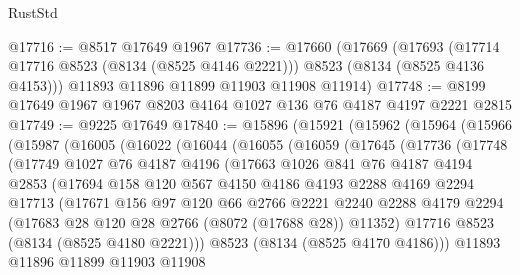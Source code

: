 \begin{lexlean}{RustStd}
\begin{coremodule}
@17716 := @8517 @17649 @1967
@17736 := @17660
    (@17669
      (@17693 (@17714 @17716 @8523 (@8134 (@8525 @4146 @2221))) @8523 (@8134 (@8525 @4136 @4153)))
      @11893
      @11896
      @11899
      @11903
      @11908
      @11914)
@17748 := @8199 @17649 @1967 @1967 @8203 @4164 @1027 @136 @76 @4187 @4197 @2221 @2815
@17749 := @9225 @17649
@17840 := @15896
    (@15921
      (@15962
        (@15964
          (@15966
            (@15987
              (@16005
                (@16022
                  (@16044
                    (@16055
                      (@16059
                        (@17645
                          (@17736
                            (@17748
                              (@17749
                                @1027
                                @76
                                @4187
                                @4196
                                (@17663
                                  @1026
                                  @841
                                  @76
                                  @4187
                                  @4194
                                  @2853
                                  (@17694
                                    @158
                                    @120
                                    @567
                                    @4150
                                    @4186
                                    @4193
                                    @2288
                                    @4169
                                    @2294
                                    @17713
                                    (@17671
                                      @156
                                      @97
                                      @120
                                      @66
                                      @2766
                                      @2221
                                      @2240
                                      @2288
                                      @4179
                                      @2294
                                      (@17683 @28 @120 @28 @2766 (@8072 (@17688 @28)) @11352)
                                      @17716
                                      @8523
                                      (@8134 (@8525 @4180 @2221)))
                                    @8523
                                    (@8134 (@8525 @4170 @4186)))
                                  @11893
                                  @11896
                                  @11899
                                  @11903
                                  @11908

\end{coremodule}
\end{lexlean}
